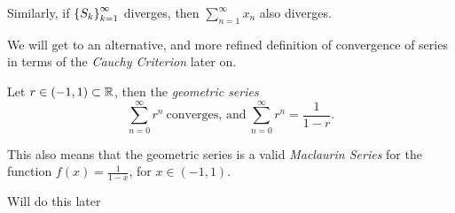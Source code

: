 \documentclass[12pt]{article}
\theoremstyle{definition}
\renewenvironment{proof}[1][\proofname]{\vspace{-10pt}\begin{replacementproof}}{\end{replacementproof}}
\begin{document}
            \begin{note}
                Similarly, if $\left\{S_{k}\right\}_{k = 1}^{\infty}$ diverges, then $\sum_{n = 1}^{\infty}x_{n}$ also diverges.
            \end{note}
            \begin{remark}
                We will get to an alternative, and more refined definition of convergence of series in terms of the \emph{Cauchy Criterion} later on.
            \end{remark}
            \begin{prop}
                Let $r \in (-1, 1) \subset \R$, then the \emph{geometric series} 
                \begin{equation*}
                    \sum_{n = 0}^{\infty}r^{n} ~ \text{converges, and} ~ \sum_{n = 0}^{\infty}r^{n} = \frac{1}{1 - r}.
                \end{equation*} 
            \end{prop}
            \begin{note}
                This also means that the geometric series is a valid \emph{Maclaurin Series} for the function $f(x) = \frac{1}{1 - x}$, for $x \in (-1, 1)$.
            \end{note}
            \begin{proof}
                Will do this later
            \end{proof}
\end{document}
